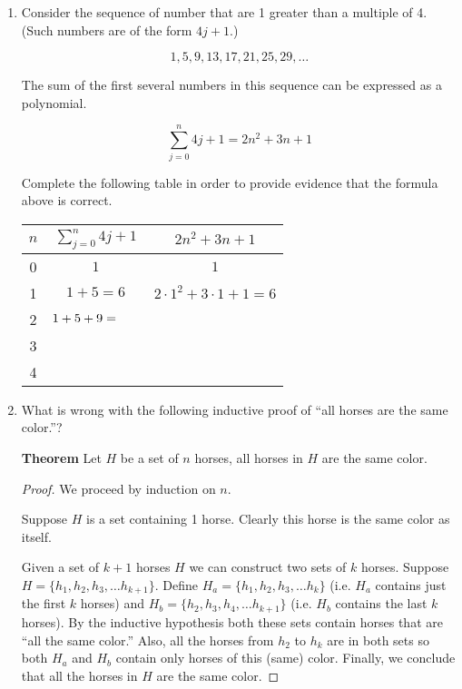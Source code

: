 \begin{enumerate}
\item Consider the sequence of number that are 1 greater than a multiple of 4.
(Such numbers are of the form $4j+1$.)

\[ 1, 5, 9, 13, 17, 21, 25, 29, \ldots \]

The sum of the first several numbers in this sequence can be expressed as
a polynomial.

\[ \sum_{j=0}^n 4j+1 = 2n^2 + 3n + 1 \]

Complete the following table in order to provide evidence that the formula
above is correct.

\begin{center}
\begin{tabular}{c|c|c}
$n$ & $\sum_{j=0}^n 4j+1$ & $2n^2 + 3n + 1$ \\ \hline
 0 & $1$ & $1$ \\
 1 & $1 + 5 = 6$ &  $2 \cdot 1^2 + 3 \cdot 1 + 1 = 6$ \\
 2 & $1 + 5 + 9 = \rule{15pt}{0pt}$ & \\
 3 & & \\
 4 & & \\
\end{tabular}
\end{center}



\item \label{ex:horses} What is wrong with the following inductive proof of
``all horses are the same color.''?

{\bf Theorem} Let $H$ be a set of $n$ horses, all horses in $H$ 
are the same color.

\begin{proof}
We proceed by induction on $n$.

 Suppose $H$ is a set containing 1 horse.  Clearly
this horse is the same color as itself.

 Given a set of $k+1$ horses $H$ we can 
construct two sets of $k$ horses.  Suppose $H = \{ h_1, h_2, h_3, \ldots h_{k+1} \}$.  Define $H_a = \{ h_1, h_2, h_3, \ldots h_{k} \}$ (i.e. $H_a$ contains
just the first $k$ horses) and $H_b = \{ h_2, h_3, h_4, \ldots h_{k+1} \}$ 
(i.e. $H_b$ contains the last $k$ horses).  By the inductive hypothesis
both these sets contain horses that are ``all the same color.''  Also,
all the horses from $h_2$ to $h_k$ are in both sets so both $H_a$ and
$H_b$ contain only horses of this (same) color.  Finally, we conclude that
all the horses in $H$ are the same color.


\end{proof}
\end{enumerate}
